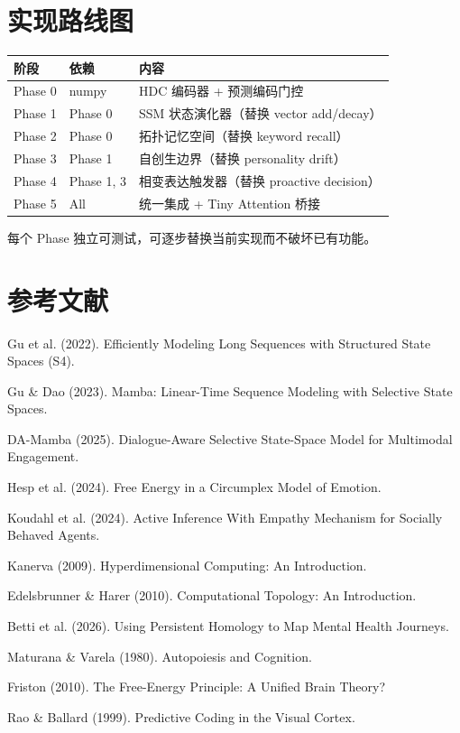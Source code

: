 \documentclass[11pt,a4paper]{article}
\begin{document}
\section{实现路线图}

\begin{table}[h]
\centering
\begin{tabular}{llp{8cm}}
\toprule
\textbf{阶段} & \textbf{依赖} & \textbf{内容} \\
\midrule
Phase 0 & numpy & HDC 编码器 + 预测编码门控 \\
Phase 1 & Phase 0 & SSM 状态演化器（替换 vector add/decay） \\
Phase 2 & Phase 0 & 拓扑记忆空间（替换 keyword recall） \\
Phase 3 & Phase 1 & 自创生边界（替换 personality drift） \\
Phase 4 & Phase 1, 3 & 相变表达触发器（替换 proactive decision） \\
Phase 5 & All & 统一集成 + Tiny Attention 桥接 \\
\bottomrule
\end{tabular}
\end{table}

每个 Phase 独立可测试，可逐步替换当前实现而不破坏已有功能。

\section{参考文献}

\begin{enumerate}[nosep,label={[\arabic*]}]
  \item Gu et al. (2022). Efficiently Modeling Long Sequences with Structured State Spaces (S4).
  \item Gu \& Dao (2023). Mamba: Linear-Time Sequence Modeling with Selective State Spaces.
  \item DA-Mamba (2025). Dialogue-Aware Selective State-Space Model for Multimodal Engagement.
  \item Hesp et al. (2024). Free Energy in a Circumplex Model of Emotion.
  \item Koudahl et al. (2024). Active Inference With Empathy Mechanism for Socially Behaved Agents.
  \item Kanerva (2009). Hyperdimensional Computing: An Introduction.
  \item Edelsbrunner \& Harer (2010). Computational Topology: An Introduction.
  \item Betti et al. (2026). Using Persistent Homology to Map Mental Health Journeys.
  \item Maturana \& Varela (1980). Autopoiesis and Cognition.
  \item Friston (2010). The Free-Energy Principle: A Unified Brain Theory?
  \item Rao \& Ballard (1999). Predictive Coding in the Visual Cortex.
\end{enumerate}
\end{document}
